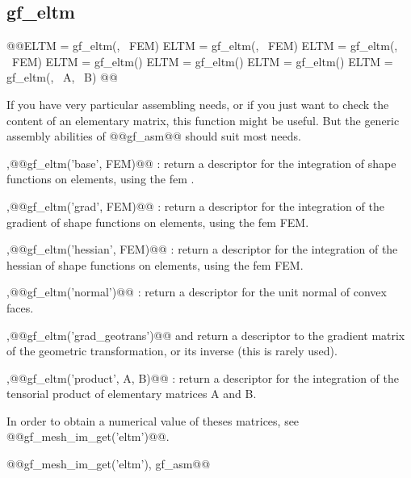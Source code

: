 \subsection{gf\_eltm}
\begin{synopsis}
@@\teltm ELTM = gf\_eltm(, \tfem\ FEM)
\teltm ELTM = gf\_eltm(, \tfem\ FEM)
\teltm ELTM = gf\_eltm(, \tfem\ FEM)
\teltm ELTM = gf\_eltm()
\teltm ELTM = gf\_eltm()
\teltm ELTM = gf\_eltm()
\teltm ELTM = gf\_eltm(, \teltm\ A, \teltm\ B)
@@\end{synopsis}
\begin{cmddescription}
  If you have very particular assembling needs, or if you just want to
  check the content of an elementary matrix, this function might be useful. But
  the generic assembly abilities of @@gf_asm@@ should suit most needs.

  \sep{@@gf\_eltm('base', FEM)@@} : return a descriptor for the
  integration of shape functions on elements, using the fem .

  \sep{@@gf\_eltm('grad', FEM)@@} : return a descriptor for the
  integration of the gradient of shape functions on elements, using
  the fem FEM.

  \sep{@@gf\_eltm('hessian', FEM)@@} : return a descriptor for the
  integration of the hessian of shape functions on elements, using the
  fem FEM.

  \sep{@@gf_eltm('normal')@@} : return a descriptor for the unit
  normal of convex faces.

  \sep{@@gf_eltm('grad_geotrans')@@} and
   return a descriptor to the
  gradient matrix of the geometric transformation, or its inverse
  (this is rarely used).

  \sep{@@gf\_eltm('product', A, B)@@} :
  return a descriptor for the integration of the tensorial product of elementary matrices A and B.
  
  In order to obtain a numerical value of theses matrices, see @@gf\_mesh\_im\_get('eltm')@@.
\end{cmddescription}
\begin{gfseealso}
  @@gf\_mesh\_im\_get('eltm'), gf_asm@@
\end{gfseealso}
\newpage


